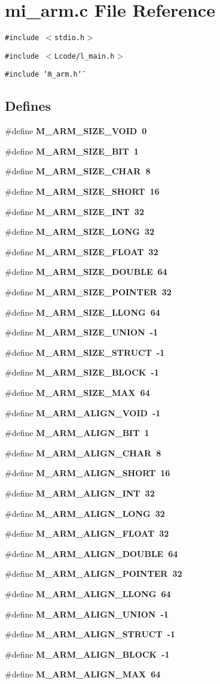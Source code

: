 \section{mi\_\-arm.c File Reference}
\label{mi__arm_8c}
{\tt \#include $<$stdio.h$>$}\par
{\tt \#include $<$Lcode/l\_\-main.h$>$}\par
{\tt \#include \char`\"{}m\_\-arm.h\char`\"{}}\par
\subsection*{Defines}
\begin{CompactItemize}
\item 
\#define \bf{M\_\-ARM\_\-SIZE\_\-VOID}~0
\item 
\#define \bf{M\_\-ARM\_\-SIZE\_\-BIT}~1
\item 
\#define \bf{M\_\-ARM\_\-SIZE\_\-CHAR}~8
\item 
\#define \bf{M\_\-ARM\_\-SIZE\_\-SHORT}~16
\item 
\#define \bf{M\_\-ARM\_\-SIZE\_\-INT}~32
\item 
\#define \bf{M\_\-ARM\_\-SIZE\_\-LONG}~32
\item 
\#define \bf{M\_\-ARM\_\-SIZE\_\-FLOAT}~32
\item 
\#define \bf{M\_\-ARM\_\-SIZE\_\-DOUBLE}~64
\item 
\#define \bf{M\_\-ARM\_\-SIZE\_\-POINTER}~32
\item 
\#define \bf{M\_\-ARM\_\-SIZE\_\-LLONG}~64
\item 
\#define \bf{M\_\-ARM\_\-SIZE\_\-UNION}~-1
\item 
\#define \bf{M\_\-ARM\_\-SIZE\_\-STRUCT}~-1
\item 
\#define \bf{M\_\-ARM\_\-SIZE\_\-BLOCK}~-1
\item 
\#define \bf{M\_\-ARM\_\-SIZE\_\-MAX}~64
\item 
\#define \bf{M\_\-ARM\_\-ALIGN\_\-VOID}~-1
\item 
\#define \bf{M\_\-ARM\_\-ALIGN\_\-BIT}~1
\item 
\#define \bf{M\_\-ARM\_\-ALIGN\_\-CHAR}~8
\item 
\#define \bf{M\_\-ARM\_\-ALIGN\_\-SHORT}~16
\item 
\#define \bf{M\_\-ARM\_\-ALIGN\_\-INT}~32
\item 
\#define \bf{M\_\-ARM\_\-ALIGN\_\-LONG}~32
\item 
\#define \bf{M\_\-ARM\_\-ALIGN\_\-FLOAT}~32
\item 
\#define \bf{M\_\-ARM\_\-ALIGN\_\-DOUBLE}~64
\item 
\#define \bf{M\_\-ARM\_\-ALIGN\_\-POINTER}~32
\item 
\#define \bf{M\_\-ARM\_\-ALIGN\_\-LLONG}~64
\item 
\#define \bf{M\_\-ARM\_\-ALIGN\_\-UNION}~-1
\item 
\#define \bf{M\_\-ARM\_\-ALIGN\_\-STRUCT}~-1
\item 
\#define \bf{M\_\-ARM\_\-ALIGN\_\-BLOCK}~-1
\item 
\#define \bf{M\_\-ARM\_\-ALIGN\_\-MAX}~64
\end{CompactItemize}
